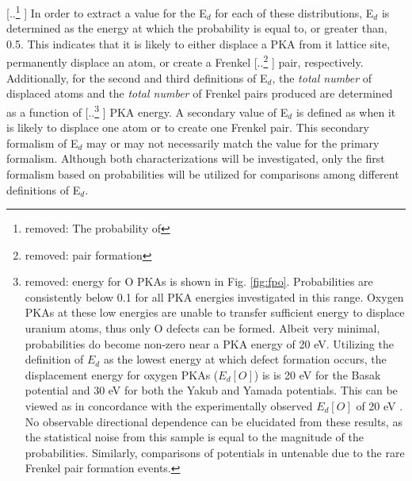 \documentclass[review]{elsarticle} %
\providecommand{\DIFaddtex}[1]{{\protect\color{blue} \sf #1}} %
\providecommand{\DIFdeltex}[1]{{\protect\color{red} [..\footnote{removed: #1} ]}} %
\providecommand{\DIFaddbegin}{} %
\providecommand{\DIFaddend}{} %
\providecommand{\DIFdelbegin}{} %
\providecommand{\DIFdelend}{} %
\providecommand{\DIFadd}[1]{\texorpdfstring{\DIFaddtex{#1}}{#1}} %
\providecommand{\DIFdel}[1]{\texorpdfstring{\DIFdeltex{#1}}{}} %
\newcommand{\DIFscaledelfig}{0.5}
\newlength{\DIFdelgraphicswidth} %
\newlength{\DIFdelgraphicsheight} %
\newcommand{\DIFaddincludegraphics}[2][]{{\color{blue}\fbox{\DIFOincludegraphics[#1]{#2}}}} %
\newcommand{\DIFdelincludegraphics}[2][]{%
\sbox{\DIFdelgraphicsbox}{\DIFOincludegraphics[#1]{#2}}%
\settoboxwidth{\DIFdelgraphicswidth}{\DIFdelgraphicsbox} %
\settoboxtotalheight{\DIFdelgraphicsheight}{\DIFdelgraphicsbox} %
\scalebox{\DIFscaledelfig}{%
\parbox[b]{\DIFdelgraphicswidth}{\usebox{\DIFdelgraphicsbox}\\[-\baselineskip] \rule{\DIFdelgraphicswidth}{0em}}\llap{\resizebox{\DIFdelgraphicswidth}{\DIFdelgraphicsheight}{%
\setlength{\unitlength}{\DIFdelgraphicswidth}%
\begin{picture}(1,1)%
\thicklines\linethickness{2pt} %
{\color[rgb]{1,0,0}\put(0,0){\framebox(1,1){}}}%
{\color[rgb]{1,0,0}\put(0,0){\line( 1,1){1}}}%
{\color[rgb]{1,0,0}\put(0,1){\line(1,-1){1}}}%
\end{picture}%
}\hspace*{3pt}}} %
} %
\DeclareRobustCommand{\DIFaddbegin}{\DIFOaddbegin \let\includegraphics\DIFaddincludegraphics} %
\DeclareRobustCommand{\DIFaddend}{\DIFOaddend \let\includegraphics\DIFOincludegraphics} %
\DeclareRobustCommand{\DIFdelbegin}{\DIFOdelbegin \let\includegraphics\DIFdelincludegraphics} %
\DeclareRobustCommand{\DIFdelend}{\DIFOaddend \let\includegraphics\DIFOincludegraphics} %
\begin{document}
\DIFdel{The probability of }\DIFdelend \DIFaddbegin \DIFadd{In order to extract a value for the E$_d$ for each of these distributions, E$_d$ is determined as the energy at which the probability is equal to, or greater than, 0.5. This indicates that it is likely to either displace a PKA from it lattice site, permanently displace an atom, or create a }\DIFaddend Frenkel \DIFdelbegin \DIFdel{pair formation }\DIFdelend \DIFaddbegin \DIFadd{pair, respectively. Additionally, for the second and third definitions of E$_d$, the \textit{total number} of displaced atoms and the \textit{total number} of Frenkel pairs produced are determined }\DIFaddend as a function of \DIFdelbegin \DIFdel{energy for O PKAs is shown in Fig. \ref{fig:fpo}. Probabilities are consistently below 0.1 for all PKA energies investigated in this range. Oxygen PKAs at these low energies are unable to transfer sufficient energy to displace uranium atoms, thus only O defects can be formed. Albeit very minimal, probabilities do become non-zero near a PKA energy of 20 eV.
Utilizing the definition of $E_d$ as the lowest energy at which defect formation occurs, the displacement energy for oxygen PKAs ($E_d [O]$) is is 20 eV for the Basak potential and 30 eV for both the Yakub and Yamada potentials. This can be viewed as in concordance with the experimentally observed $E_d [O]$ of 20 eV \cite{soullard1977,soullard1985}. No observable directional dependence can be elucidated from these results, as the statistical noise from this sample is equal to the magnitude of the probabilities. Similarly, comparisons of potentials in untenable due to the rare Frenkel pair formation events.
}\DIFdelend \DIFaddbegin \DIFadd{PKA energy. A secondary value of E$_d$ is defined as when it is likely to displace one atom or to create one Frenkel pair. This secondary formalism of E$_d$ may or may not necessarily match the value for the primary formalism. Although both characterizations will be investigated, only the first formalism based on probabilities will be utilized for comparisons among different definitions of E$_d$.
}\DIFaddend 
\end{document}
